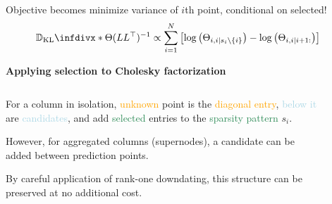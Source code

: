 \documentclass{beamer}                             %
\newcommand{\blocktitle}[1]{{\Large \textbf{#1}}}
\newcommand*{\CM}{\Theta}
\newcommand*{\KL}{\mathbb{D}_{\operatorname{KL}}\infdivx}
\begin{document}
\begin{frame}[t]
\begin{columns}[T]
\begin{column}{0.30\textwidth}
\begin{tcolorbox}
    Objective becomes minimize variance of \(
    i \)th point, conditional on selected!
    \begin{align*}
      \KL*{\CM}{(L L^{\top})^{-1}} &\propto
      \sum_{i = 1}^N
        \left [
          \log \left ( \CM_{i, i \mid s_i \setminus \{ i \}} \right ) -
          \log \left ( \CM_{i, i \mid i + 1:} \right )
        \right ]
    \end{align*}
  \end{tcolorbox}

  \begin{tcolorbox}
    \blocktitle{Applying selection to Cholesky factorization}
    \vspace{-0.5\baselineskip}

    \begin{columns}
      \begin{column}{0.5\textwidth}
        For a column in isolation, \textcolor{orange}{unknown}
        point is the \textcolor{orange}{diagonal entry},
        \textcolor{lightblue}{below it} are \textcolor{lightblue}{candidates},
        and add \textcolor{seagreen}{selected} entries to the
        \textcolor{seagreen}{sparsity pattern} \( s_i \).

        \vspace{\baselineskip}
        However, for aggregated columns (supernodes), a
        candidate can be added between prediction points.

        By careful application of rank-one downdating, this
        structure can be preserved at no additional cost.
      \end{column}
      \begin{column}{0.5\textwidth}
        \vspace{-\baselineskip}
        \begin{figure}[t]
          \centering
        \end{figure}
      \end{column}
    \end{columns}
  \end{tcolorbox}
\end{column}


\end{columns}
\end{frame}
\end{document}
